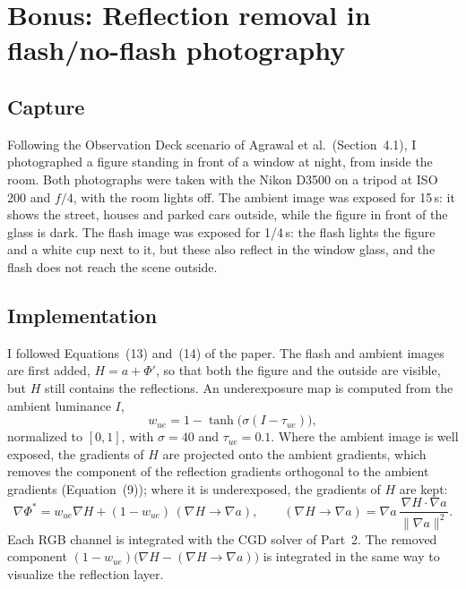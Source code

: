 \documentclass[11pt]{article}
\begin{document}
\section{Bonus: Reflection removal in flash/no-flash photography}
\subsection*{Capture}
Following the Observation Deck scenario of Agrawal et al.\ (Section~4.1), I photographed a figure standing in front of a window at night, from inside the room. Both photographs were taken with the Nikon D3500 on a tripod at ISO 200 and $f/4$, with the room lights off. The ambient image was exposed for 15\,s: it shows the street, houses and parked cars outside, while the figure in front of the glass is dark. The flash image was exposed for 1/4\,s: the flash lights the figure and a white cup next to it, but these also reflect in the window glass, and the flash does not reach the scene outside.

\subsection*{Implementation}
I followed Equations~(13) and~(14) of the paper. The flash and ambient images are first added, $H=a+\Phi'$, so that both the figure and the outside are visible, but $H$ still contains the reflections. An underexposure map is computed from the ambient luminance $I$,
\begin{equation*}
w_{ue}=1-\tanh\big(\sigma(I-\tau_{ue})\big),
\end{equation*}
normalized to $[0,1]$, with $\sigma=40$ and $\tau_{ue}=0.1$. Where the ambient image is well exposed, the gradients of $H$ are projected onto the ambient gradients, which removes the component of the reflection gradients orthogonal to the ambient gradients (Equation~(9)); where it is underexposed, the gradients of $H$ are kept:
\begin{equation*}
\nabla\Phi^*=w_{ue}\nabla H+(1-w_{ue})\,(\nabla H\rightarrow\nabla a),\qquad
(\nabla H\rightarrow\nabla a)=\nabla a\,\frac{\nabla H\cdot\nabla a}{\|\nabla a\|^2}.
\end{equation*}
Each RGB channel is integrated with the CGD solver of Part~2. The removed component $(1-w_{ue})\big(\nabla H-(\nabla H\rightarrow\nabla a)\big)$ is integrated in the same way to visualize the reflection layer.
\end{document}
